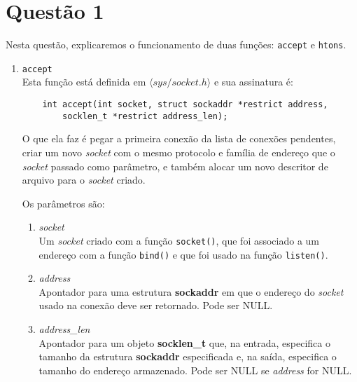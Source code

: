 \documentclass[a4paper,10pt]{article}
\begin{document}
\section{Questão 1}
Nesta questão, explicaremos o funcionamento de duas funções: {\tt accept} e {\tt htons}.
\begin{enumerate}
\item {\tt accept}\\
    Esta função está definida em $\langle sys/socket.h \rangle$ e sua assinatura é:
    \begin{lstlisting}
    int accept(int socket, struct sockaddr *restrict address,
        socklen_t *restrict address_len);
    \end{lstlisting}
    O que ela faz é pegar a primeira conexão da lista de conexões pendentes, criar um novo \textit{socket} com o mesmo protocolo e família de endereço que o \textit{socket} passado como parâmetro, e também alocar um novo descritor de arquivo para o \textit{socket} criado.
    
    Os parâmetros são:
    \begin{enumerate}
        \item \textit{socket}\\
        Um \textit{socket} criado com a função {\tt socket()}, que foi associado a um endereço com a função {\tt bind()} e que foi usado na função {\tt listen()}.
        \item \textit{address}\\
        Apontador para uma estrutura \textbf{sockaddr} em que o endereço do \textit{socket} usado na conexão deve ser retornado. Pode ser NULL.
        \item \textit{address\_len}\\
        Apontador para um objeto \textbf{socklen\_t} que, na entrada, especifica o tamanho da estrutura \textbf{sockaddr} especificada e, na saída, especifica o tamanho do endereço armazenado. Pode ser NULL se \textit{address} for NULL.
    \end{enumerate}
    

\end{enumerate}
\end{document}
